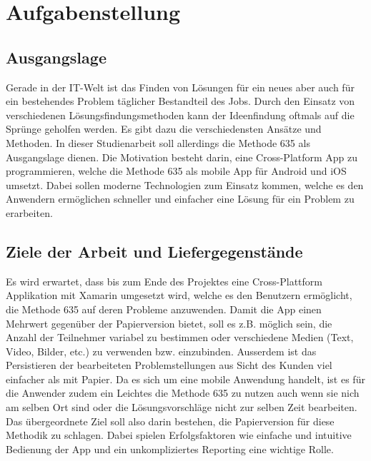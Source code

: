 \section{Aufgabenstellung}

\subsection{Ausgangslage}
Gerade in der IT-Welt ist das Finden von Lösungen für ein neues aber auch für ein bestehendes Problem täglicher Bestandteil des Jobs. Durch den Einsatz von verschiedenen Lösungs\-findungs\-methoden kann der Ideenfindung oftmals auf die Sprünge geholfen werden. Es gibt dazu die verschiedensten Ansätze und Methoden. 
In dieser Studienarbeit soll allerdings die Methode 635 als Ausgangslage dienen. Die Motivation besteht darin, eine Cross-Platform App zu programmieren, welche die Methode 635 als mobile App für Android und iOS umsetzt. Dabei sollen moderne Technologien zum Einsatz kommen, welche es den Anwendern ermöglichen schneller und einfacher eine Lösung für ein Problem zu erarbeiten. 

\subsection{Ziele der Arbeit und Liefergegenstände}

Es wird erwartet, dass bis zum Ende des Projektes eine Cross-Plattform Applikation mit Xamarin umgesetzt wird, welche es den Benutzern ermöglicht, die Methode 635 auf deren Probleme anzuwenden. Damit die App einen Mehrwert gegenüber der Papierversion bietet, soll es z.B. möglich sein, die Anzahl der Teilnehmer variabel zu bestimmen oder verschiedene Medien (Text, Video, Bilder, etc.) zu verwenden bzw. einzubinden. Ausserdem ist das Persistieren der bearbeiteten Problemstellungen aus Sicht des Kunden viel einfacher als mit Papier.
Da es sich um eine mobile Anwendung handelt, ist es für die Anwender zudem ein Leichtes die Methode 635 zu nutzen auch wenn sie nich am selben Ort sind oder die Lösungsvorschläge nicht zur selben Zeit bearbeiten. 
Das übergeordnete Ziel soll also darin bestehen, die Papierversion für diese Methodik zu schlagen. Dabei spielen Erfolgsfaktoren wie einfache und intuitive Bedienung der App und ein unkompliziertes Reporting eine wichtige Rolle.
